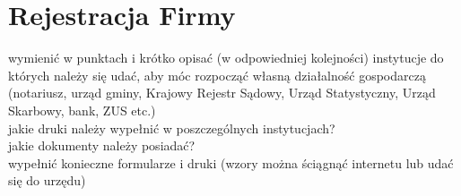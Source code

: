 \section{Rejestracja Firmy}
wymienić w punktach i krótko opisać (w odpowiedniej kolejności) instytucje do których należy się udać, aby móc rozpocząć własną działalność gospodarczą (notariusz, urząd gminy, Krajowy Rejestr Sądowy, Urząd Statystyczny, Urząd Skarbowy, bank, ZUS etc.)\\
jakie druki należy wypełnić w poszczególnych instytucjach?\\
jakie dokumenty należy posiadać?\\
wypełnić konieczne formularze i druki (wzory można ściągnąć internetu lub udać się do urzędu)\\